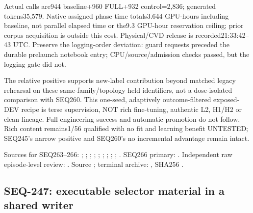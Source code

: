 \documentclass{article}
\begin{document}
Actual calls are944 baseline+960 FULL+932 control=2,836; generated tokens35,579.
Native assigned phase time totals3.644 GPU-hours including baseline, not parallel
elapsed time or the9.3 GPU-hour reservation ceiling; prior corpus acquisition is
outside this cost. Physical/CVD release is recorded21:33:42--43 UTC. Preserve the
logging-order deviation: guard requests preceded the durable prelaunch notebook
entry; CPU/source/admission checks passed, but the logging gate did not.

The relative positive supports new-label contribution beyond matched legacy
rehearsal on these same-family/topology held identifiers, not a dose-isolated
comparison with SEQ260. This one-seed, adaptively outcome-filtered exposed-DEV
recipe is terse supervision, NOT rich fine-tuning, authentic L2, H1/H2 or clean
lineage. Full engineering success and automatic promotion do not follow.
Rich content remains1/56 qualified with no fit and learning benefit UNTESTED;
SEQ245's narrow positive and SEQ260's no incremental advantage remain intact.

Sources for SEQ263--266: ;
;
;
;
;
;
;
;
;
.
SEQ266 primary: .
Independent raw episode-level review: .
Source ; terminal archive:
,
SHA256 .

\subsection{SEQ-247: executable selector material in a shared writer}
\label{sec:selector-transfer-write}
\end{document}
